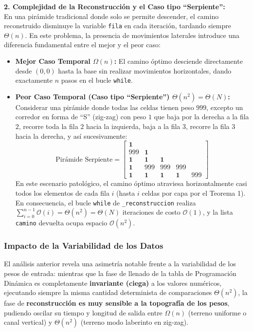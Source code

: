 \textbf{2. Complejidad de la Reconstrucción y el Caso tipo ``Serpiente'':} \\
En una pirámide tradicional donde solo se permite descender, el camino reconstruido disminuye la variable \verb|fila| en cada iteración, tardando siempre $\Theta(n)$. En este problema, la presencia de movimientos laterales introduce una diferencia fundamental entre el mejor y el peor caso:
\begin{itemize}
    \item \textbf{Mejor Caso Temporal $\Omega(n)$:} El camino óptimo desciende directamente desde $(0,0)$ hasta la base sin realizar movimientos horizontales, dando exactamente $n$ pasos en el bucle \verb|while|.
    \item \textbf{Peor Caso Temporal (Caso tipo ``Serpiente'') $\Theta(n^2) = \Theta(N)$:} Considerar una pirámide donde todas las celdas tienen peso $999$, excepto un corredor en forma de ``S'' (zig-zag) con peso $1$ que baja por la derecha a la fila $2$, recorre toda la fila $2$ hacia la izquierda, baja a la fila $3$, recorre la fila $3$ hacia la derecha, y así sucesivamente:
    \[\text{Pirámide Serpiente} = \begin{bmatrix} \mathbf{1} \\ 999 & \mathbf{1} \\ \mathbf{1} & \mathbf{1} & \mathbf{1} \\ \mathbf{1} & 999 & 999 & 999 \\ \mathbf{1} & \mathbf{1} & \mathbf{1} & \mathbf{1} & 999 \end{bmatrix}\]
    En este escenario patológico, el camino óptimo atraviesa horizontalmente casi todos los elementos de cada fila $i$ (hasta $i$ celdas por capa por el Teorema 1). En consecuencia, el bucle \verb|while| de \verb|_reconstruccion| realiza $\sum_{i=0}^{n-1} \mathcal{O}(i) = \Theta(n^2) = \Theta(N)$ iteraciones de costo $\mathcal{O}(1)$, y la lista \verb|camino| devuelta ocupa espacio $\mathcal{O}(n^2)$.
\end{itemize}

\subsubsection{Impacto de la Variabilidad de los Datos}
El análisis anterior revela una asimetría notable frente a la variabilidad de los pesos de entrada: mientras que la fase de llenado de la tabla de Programación Dinámica es completamente \textbf{invariante (ciega)} a los valores numéricos, ejecutando siempre la misma cantidad determinista de comparaciones $\Theta(n^2)$, la fase de \textbf{reconstrucción es muy sensible a la topografía de los pesos}, pudiendo oscilar su tiempo y longitud de salida entre $\Omega(n)$ (terreno uniforme o canal vertical) y $\Theta(n^2)$ (terreno modo laberinto en zig-zag).

